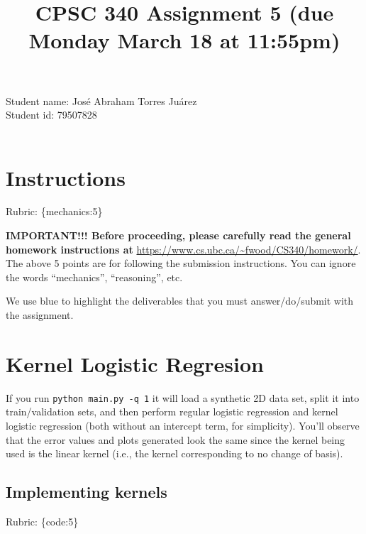 \documentclass{article}
\def\rubric#1{\gre{Rubric: \{#1\}}}{}
\def\blu#1{{\color{blu}#1}}
\def\gre#1{{\color{gre}#1}}
\def\ans#1{{\color{ans}#1}}
\begin{document}
\title{CPSC 340 Assignment 5 (due Monday March 18 at 11:55pm)}
\date{}
\maketitle

\vspace{-4em}
\ans{
    Student name: José Abraham Torres Juárez \\
    Student id: 79507828 \\ \\
}


\section*{Instructions}
\rubric{mechanics:5}

\textbf{IMPORTANT!!! Before proceeding, please carefully read the general homework instructions at} \url{https://www.cs.ubc.ca/~fwood/CS340/homework/}. The above 5 points are for following the submission instructions. You can ignore the words ``mechanics'', ``reasoning'', etc.

\vspace{1em}
We use \blu{blue} to highlight the deliverables that you must answer/do/submit with the assignment.


\section{Kernel Logistic Regresion}

If you run \verb|python main.py -q 1| it will load a synthetic 2D data set, split it into train/validation sets, and then perform regular logistic regression and kernel logistic regression (both without an intercept term, for simplicity). You'll observe that the error values and plots generated look the same since the kernel being used is the linear kernel (i.e., the kernel corresponding to no change of basis).
\clearpage
\subsection{Implementing kernels}
\rubric{code:5}
\end{document}
